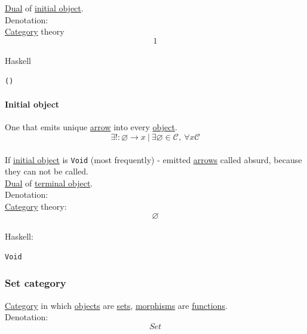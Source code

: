 \documentclass[11pt]{article}
\begin{document}
\hyperref[org0a6da4c]{Dual} of \hyperref[org7d94b27]{initial object}.\\

Denotation:\\

\hyperref[org3e3a79b]{Category} theory\\
$$ 1 $$\\

Haskell\\
\begin{verbatim}
()
\end{verbatim}

\paragraph{\label{org7d94b27}Initial object}
\label{sec:org05b82fa}
One that emits unique \hyperref[org5b6e6e9]{arrow} into every \hyperref[org025aac8]{object}.\\

$$ \exists ! : \varnothing \to x \ | \ \exists \varnothing \in \mathcal{C}, \ \forall x \mathcal{C} $$\\

If \hyperref[org7d94b27]{initial object} is \texttt{Void} (most frequently) - emitted \hyperref[org33f3f3f]{arrows} called absurd, because they can not be called.\\

\hyperref[org0a6da4c]{Dual} of \hyperref[org05f2dea]{terminal object}.\\

Denotation:\\

\hyperref[org3e3a79b]{Category} theory:\\
$$ \varnothing $$\\

Haskell:\\
\begin{verbatim}
Void
\end{verbatim}

\subsubsection{\label{orga1444f9}Set category}
\label{sec:org34353cc}
\hyperref[org3e3a79b]{Category} in which \hyperref[orge0f000f]{objects} are \hyperref[org4e7443a]{sets}, \hyperref[org8ed0ce8]{morphisms} are \hyperref[org66c5288]{functions}.\\

Denotation:\\
$$ Set $$\\
\end{document}
